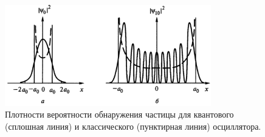 \begin{figure}[h]
  \centering
  \includegraphics[width=0.8\textwidth]{img/write-02/dPdx.png}
  \caption{Плотности вероятности обнаружения частицы для 
квантового (сплошная линия) и классического (пунктирная линия) осциллятора.}
  \label{fig:dPdx}
\end{figure}
